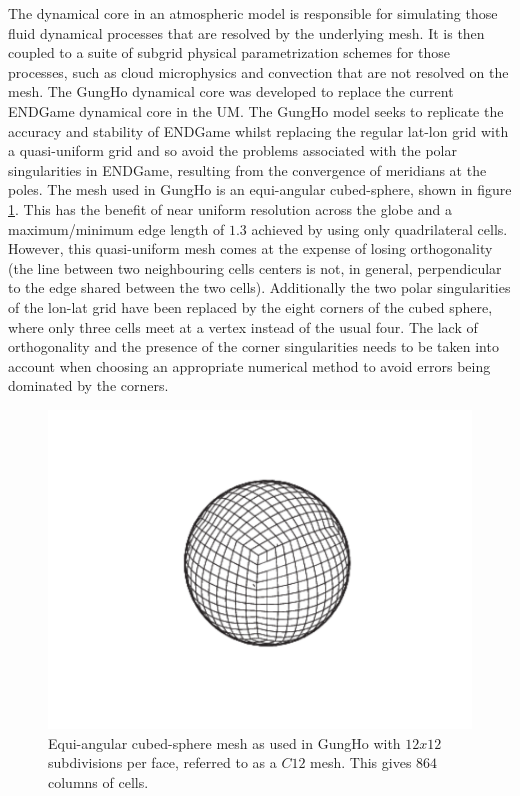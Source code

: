 \documentclass[review,times]{elsarticle}
\begin{document}
The dynamical core in an atmospheric model is responsible for
simulating those fluid dynamical processes that are resolved by the
underlying mesh. It is then coupled to a suite of subgrid physical
parametrization schemes for those processes, such as cloud
microphysics and convection that are not resolved on the mesh.  The
GungHo dynamical core was developed to replace the current ENDGame
dynamical core in the UM. The GungHo model seeks to replicate the
accuracy and stability of ENDGame whilst replacing the regular lat-lon
grid with a quasi-uniform grid and so avoid the problems associated
with the polar singularities in ENDGame, resulting from the
convergence of meridians at the poles. The mesh used in GungHo is an
equi-angular cubed-sphere, shown in figure \ref{fig:cubed-sphere}.
This has the benefit of near uniform resolution across the globe and a
maximum/minimum edge length of $1.3$ achieved by using only
quadrilateral cells.  However, this quasi-uniform mesh comes at the
expense of losing orthogonality (the line between two neighbouring
cells centers is not, in general, perpendicular to the edge shared
between the two cells). Additionally the two polar singularities of
the lon-lat grid have been replaced by the eight corners of
the cubed sphere, where only three cells meet at a vertex instead of
the usual four. The lack of orthogonality and the presence of the
corner singularities needs to be taken into account when choosing an
appropriate numerical method to avoid errors being dominated by the
corners.
%
\begin{figure}
\centering\includegraphics[width=0.8\linewidth]{Cubed-Sphere.pdf}
\caption{\label{fig:cubed-sphere} Equi-angular cubed-sphere mesh as
used in GungHo with $12x12$ subdivisions per face, 
referred to as a $C12$ mesh. This gives $864$ columns of cells. }
\end{figure}
%
\end{document}
